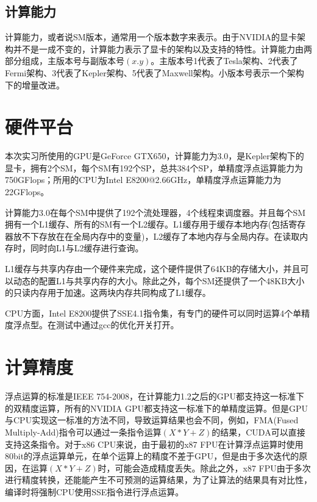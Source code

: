     \subsection{计算能力}
      计算能力，或者说SM版本，通常用一个版本数字来表示。由于NVIDIA的显卡架构并不是一成不变的，计算能力表示了显卡的架构以及支持的特性。计算能力由两部分组成，主版本号与副版本号$(x.y)$。主版本号1代表了Tesla架构、2代表了Fermi架构、3代表了Kepler架构、5代表了Maxwell架构。小版本号表示一个架构下的增量改进。
  \section{硬件平台}
    本次实习所使用的GPU是GeForce GTX650，计算能力为3.0，是Kepler架构下的显卡，拥有2个SM，每个SM有192个SP，总共384个SP，单精度浮点运算能力为750GFlops；所用的CPU为Intel E8200@2.66GHz，单精度浮点运算能力为22GFlops。
    \par
    计算能力3.0在每个SM中提供了192个流处理器，4个线程束调度器。并且每个SM拥有一个L1缓存、所有的SM有一个L2缓存。L1缓存用于缓存本地内存(包括寄存器放不下存放在在全局内存中的变量)，L2缓存了本地内存与全局内存。在读取内存时，同时向L1与L2缓存进行查询。
    \par
    L1缓存与共享内存由一个硬件来完成，这个硬件提供了64KB的存储大小，并且可以动态的配置L1与共享内存的大小。除此之外，每个SM还提供了一个48KB大小的只读内存用于加速。这两块内存共同构成了L1缓存。
    \par
    CPU方面，Intel E8200提供了SSE4.1指令集，有专门的硬件可以同时运算4个单精度浮点型。在测试中通过gcc的优化开关打开。
  \section{计算精度}
    浮点运算的标准是IEEE 754-2008，在计算能力1.2之后的GPU都支持这一标准下的双精度运算\cite{whitehead2011precision}，所有的NVIDIA GPU都支持这一标准下的单精度运算。但是GPU与CPU实现这一标准的方法不同，导致运算结果也会不同，例如，FMA(Fused Multiply-Add)指令可以通过一条指令运算$(X*Y+Z)$的结果，CUDA可以直接支持这条指令。对于x86 CPU来说，由于最初的x87 FPU在计算浮点运算时使用80bit的浮点运算单元，在单个运算上的精度不差于GPU，但是由于多次迭代的原因，在运算$(X*Y+Z)$时，可能会造成精度丢失。除此之外，x87 FPU由于多次进行精度转换，还能能产生不可预测的运算结果，为了让算法的结果具有对比性，编译时将强制CPU使用SSE指令进行浮点运算。